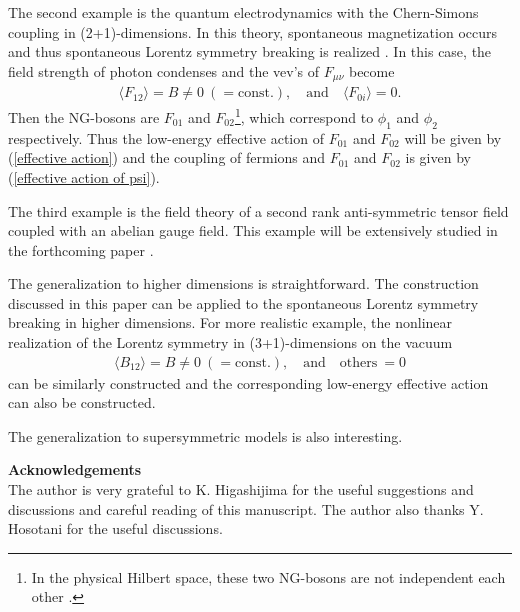 \documentclass[a4paper,12pt]{article}
\begin{document}
The second example is the quantum electrodynamics with 
the Chern-Simons coupling in (2+1)-dimensions. 
In this theory, spontaneous magnetization occurs and thus 
spontaneous Lorentz symmetry breaking is realized 
\cite{Hosotani1, Hosotani2}.
In this case, the field strength of photon condenses and 
the vev's of $F_{\mu \nu}$ become 
\begin{eqnarray}
\langle F_{12} \rangle = B \neq 0~(= \textrm{const.}), \quad
\textrm{and} \quad 
\langle F_{0i} \rangle = 0.
\end{eqnarray}
Then the NG-bosons are $F_{01}$ and $F_{02}$\footnote{In the physical
Hilbert space, these two NG-bosons are not independent each other 
\cite{Hosotani2}.}, which correspond to $\phi_{1}$ and $\phi_{2}$ 
respectively.
Thus the low-energy effective action of 
$F_{01}$ and $F_{02}$
will be given by (\ref{effective action}) 
and the coupling of fermions and $F_{01}$ and $F_{02}$
is given by (\ref{effective action of psi}).       

The third example is the field theory of a second rank 
anti-symmetric tensor field coupled with an abelian gauge field.
This example will be extensively studied in the forthcoming paper \cite{H-Y}. 

The generalization to higher dimensions is 
straightforward. The construction discussed in this paper 
can be applied to the spontaneous Lorentz symmetry breaking 
in higher dimensions.
For more realistic example, the nonlinear realization of 
the Lorentz symmetry in (3+1)-dimensions on the vacuum
\begin{eqnarray}
\langle B_{12} \rangle = B \neq 0~(= \textrm{const.}),  \quad
\textrm{and~~~others}~= 0
\end{eqnarray}
can be similarly constructed and the corresponding low-energy 
effective action can also be constructed. 

The generalization to supersymmetric models is also 
interesting. 


{\bf Acknowledgements} \\
The author is very grateful to K. Higashijima for 
the useful suggestions and discussions and 
careful reading of this manuscript.
The author also thanks Y. Hosotani for the useful discussions.
\end{document}
